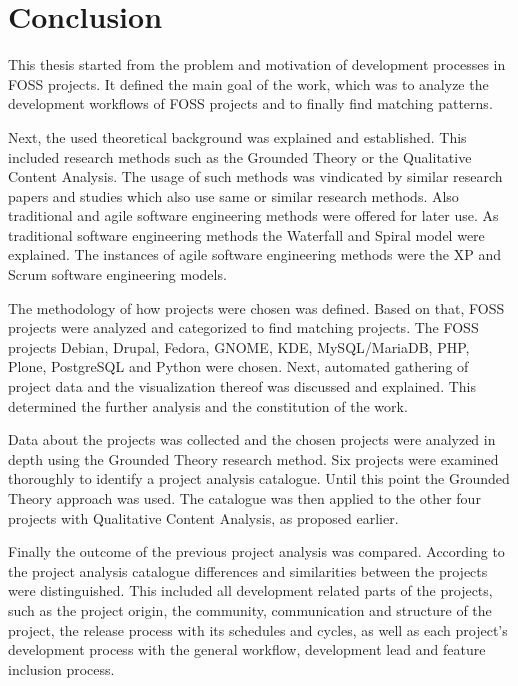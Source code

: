 \chapter{Conclusion} %
\label{chap:conclusion}

This thesis started from the problem and motivation of development processes in
\ac{FOSS} projects. It defined the main goal of the work, which was to analyze
the development workflows of \ac{FOSS} projects and to finally find matching
patterns.

Next, the used theoretical background was explained and established. This
included research methods such as the Grounded Theory or the Qualitative
Content Analysis. The usage of such methods was vindicated by similar research
papers and studies which also use same or similar research methods. Also
traditional and agile software engineering methods were offered for later use.
As traditional software engineering methods the Waterfall and Spiral model were
explained. The instances of agile software engineering methods were the
\acl{XP} and Scrum software engineering models.

The methodology of how projects were chosen was defined. Based on that,
\ac{FOSS} projects were analyzed and categorized to find matching projects. The
\ac{FOSS} projects Debian, Drupal, Fedora, GNOME, KDE, MySQL/MariaDB, PHP,
Plone, PostgreSQL and Python were chosen. Next, automated gathering of project
data and the visualization thereof was discussed and explained. This determined
the further analysis and the constitution of the work.

Data about the projects was collected and the chosen projects were analyzed in
depth using the Grounded Theory research method. Six projects were examined
thoroughly to identify a project analysis catalogue. Until this point the
Grounded Theory approach was used. The catalogue was then applied to the other
four projects with Qualitative Content Analysis, as proposed earlier.

Finally the outcome of the previous project analysis was compared. According to
the project analysis catalogue differences and similarities between the
projects were distinguished. This included all development related parts of the
projects, such as the project origin, the community, communication and
structure of the project, the release process with its schedules and cycles, as
well as each project's development process with the general workflow,
development lead and feature inclusion process.

